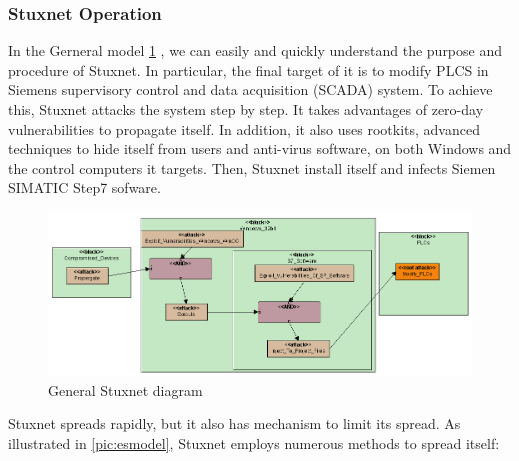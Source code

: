 \documentclass[a4paper,12pt,oneside]{report}
\begin{document}
	\subsubsection{Stuxnet Operation}
	In the Gerneral model \ref{pic:gsmodel} , we can easily and quickly understand the purpose and procedure of Stuxnet. In particular, the final target of it is to modify PLCS in Siemens supervisory control and data acquisition (SCADA) system. To achieve this, Stuxnet attacks the system step by step. It takes advantages of zero-day vulnerabilities to propagate itself. In addition, it also uses rootkits, advanced techniques to hide itself from users and anti-virus software, on both Windows and the control computers it targets. Then, Stuxnet install itself and infects Siemen SIMATIC Step7 sofware.
	\begin{figure}[hb]
	 \centering
	\includegraphics[scale=0.45]{General_Stuxnet.png}\par
	\caption{General Stuxnet diagram}
	\label{pic:gsmodel}
	\end{figure}
	Stuxnet spreads rapidly, but it also has mechanism to limit its spread. As illustrated in \ref{pic:esmodel}, Stuxnet employs numerous methods to spread itself\cite{stuxnet3}:
\end{document}
